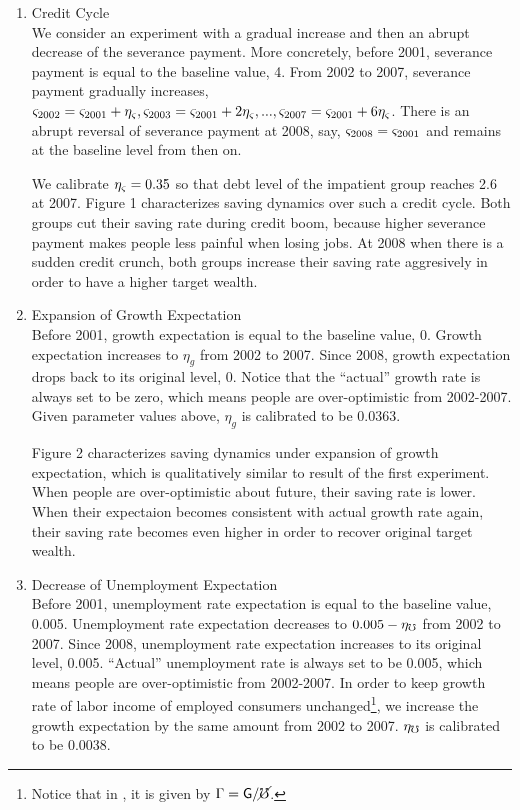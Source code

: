 \documentclass[titlepage,abstract,letterpaper]{bejournal}
\begin{document}
\begin{enumerate}
\item Credit Cycle\\
We consider an experiment with a gradual increase and then an abrupt decrease of the severance payment. More concretely, before 2001, severance payment is equal to the baseline value, 4. From 2002 to 2007, severance payment gradually increases, $\varsigma_{2002}=\varsigma_{2001}+\eta_{\varsigma},\varsigma_{2003}=\varsigma_{2001}+2\eta_{\varsigma},...,\varsigma_{2007}=\varsigma_{2001}+6\eta_{\varsigma}$. There is an abrupt reversal of severance payment at 2008, say, $\varsigma_{2008}=\varsigma_{2001}$ and remains at the baseline level from then on. 

We calibrate $\eta_{\varsigma}=0.35$ so that debt level of the impatient group reaches 2.6 at 2007.
Figure 1 characterizes saving dynamics over such a credit cycle. Both groups cut their saving rate during credit boom, because higher severance payment makes people less painful when losing jobs. At 2008 when there is a sudden credit crunch, both groups increase their saving rate aggresively in order to have a higher target wealth.

\item Expansion of Growth Expectation\\
Before 2001, growth expectation is equal to the baseline value, 0. Growth expectation increases to $\eta_g$ from 2002 to 2007. Since 2008, growth expectation drops back to its original level, 0. Notice that the ``actual'' growth rate is always set to be zero, which means people are over-optimistic from 2002-2007. Given parameter values above, $\eta_g$ is calibrated to be 0.0363. 

Figure 2 characterizes saving dynamics under expansion of growth expectation, which is qualitatively similar to result of the first experiment. When people are over-optimistic about future, their saving rate is lower. When their expectaion becomes consistent with actual growth rate again, their saving rate becomes even higher in order to recover original target wealth.

\item Decrease of Unemployment Expectation\\
Before 2001, unemployment rate expectation is equal to the baseline value, 0.005. Unemployment rate expectation decreases to $0.005-\eta_{\mho}$ from 2002 to 2007. Since 2008, unemployment rate expectation increases to its original level, 0.005.  ``Actual'' unemployment rate is always set to be 0.005, which means people are over-optimistic from 2002-2007. In order to keep growth rate of labor income of employed consumers unchanged\footnote{Notice that in \cite{ctDiscrete}, it is given by $\Gamma = \mathsf{G}/\cancel{\mho}$.}, we increase the growth expectation by the same amount from 2002 to 2007.  $\eta_{\mho}$ is calibrated to be 0.0038.


\end{enumerate}
\end{document}
